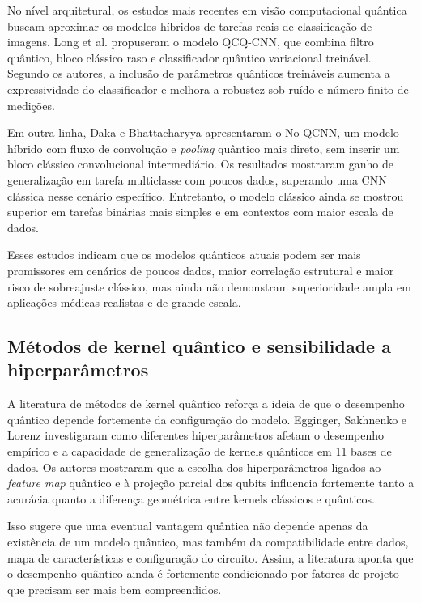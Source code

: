 \documentclass[
    12pt,
    openright,
    oneside,
    a4paper,
    english,
    brazil
]{abntex2}
\begin{document}
No nível arquitetural, os estudos mais recentes em visão computacional quântica buscam aproximar os modelos híbridos de tarefas reais de classificação de imagens. Long et al. \cite{long2025} propuseram o modelo QCQ-CNN, que combina filtro quântico, bloco clássico raso e classificador quântico variacional treinável. Segundo os autores, a inclusão de parâmetros quânticos treináveis aumenta a expressividade do classificador e melhora a robustez sob ruído e número finito de medições.

Em outra linha, Daka e Bhattacharyya \cite{daka2026} apresentaram o No-QCNN, um modelo híbrido com fluxo de convolução e \textit{pooling} quântico mais direto, sem inserir um bloco clássico convolucional intermediário. Os resultados mostraram ganho de generalização em tarefa multiclasse com poucos dados, superando uma CNN clássica nesse cenário específico. Entretanto, o modelo clássico ainda se mostrou superior em tarefas binárias mais simples e em contextos com maior escala de dados.

Esses estudos indicam que os modelos quânticos atuais podem ser mais promissores em cenários de poucos dados, maior correlação estrutural e maior risco de sobreajuste clássico, mas ainda não demonstram superioridade ampla em aplicações médicas realistas e de grande escala.

\subsection{Métodos de kernel quântico e sensibilidade a hiperparâmetros}

A literatura de métodos de kernel quântico reforça a ideia de que o desempenho quântico depende fortemente da configuração do modelo. Egginger, Sakhnenko e Lorenz \cite{egginger2024} investigaram como diferentes hiperparâmetros afetam o desempenho empírico e a capacidade de generalização de kernels quânticos em 11 bases de dados. Os autores mostraram que a escolha dos hiperparâmetros ligados ao \textit{feature map} quântico e à projeção parcial dos qubits influencia fortemente tanto a acurácia quanto a diferença geométrica entre kernels clássicos e quânticos.

Isso sugere que uma eventual vantagem quântica não depende apenas da existência de um modelo quântico, mas também da compatibilidade entre dados, mapa de características e configuração do circuito. Assim, a literatura aponta que o desempenho quântico ainda é fortemente condicionado por fatores de projeto que precisam ser mais bem compreendidos.
\end{document}
